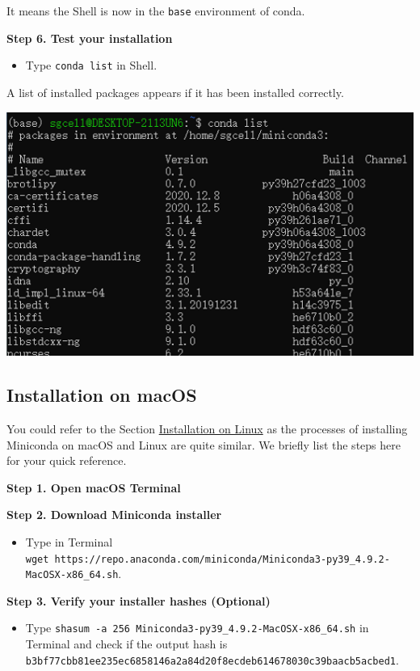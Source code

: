 \documentclass[
]{book}
\providecommand{\tightlist}{%
  \setlength{\itemsep}{0pt}\setlength{\parskip}{0pt}}
\begin{document}
It means the Shell is now in the \texttt{base} environment of conda.

\textbf{Step 6. Test your installation}

\begin{itemize}
\tightlist
\item
  Type \texttt{conda\ list} in Shell.
\end{itemize}

A list of installed packages appears if it has been installed correctly.

\begin{center}\includegraphics[width=0.5\linewidth]{./images/conda_test_conda} \end{center}

\hypertarget{conda_install_mac}{%
\subsection{Installation on macOS}\label{conda_install_mac}}

You could refer to the Section \protect\hyperlink{conda_install_linux}{Installation on Linux} as the processes of installing Miniconda on macOS and Linux are quite similar. We briefly list the steps here for your quick reference.

\textbf{Step 1. Open macOS Terminal}

\textbf{Step 2. Download Miniconda installer}

\begin{itemize}
\tightlist
\item
  Type in Terminal \texttt{wget\ https://repo.anaconda.com/miniconda/Miniconda3-py39\_4.9.2-MacOSX-x86\_64.sh}.
\end{itemize}

\textbf{Step 3. Verify your installer hashes (Optional)}

\begin{itemize}
\tightlist
\item
  Type \texttt{shasum\ -a\ 256\ Miniconda3-py39\_4.9.2-MacOSX-x86\_64.sh} in Terminal and check if the output hash is \texttt{b3bf77cbb81ee235ec6858146a2a84d20f8ecdeb614678030c39baacb5acbed1}.
\end{itemize}
\end{document}
